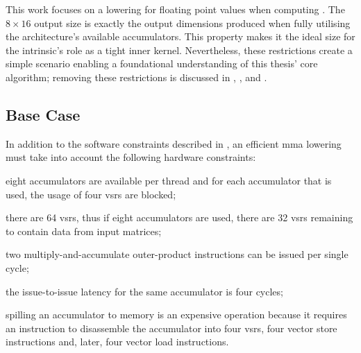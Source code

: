 \documentclass[\main/thesis.tex]{subfiles}
\begin{document}
This work focuses on a lowering for floating point values when computing .
The $8 \times 16$ output size is exactly the output dimensions produced when fully utilising the architecture's available accumulators.
This property makes it the ideal size for the intrinsic's role as a tight inner kernel.
Nevertheless, these restrictions create a simple scenario enabling a foundational understanding of this thesis' core algorithm; removing these restrictions is discussed in , , and .

\subsection{Base Case}
\label{sec:baseCase}
In addition to the software constraints described in , an efficient \gls{mma} lowering must take into account the following hardware constraints:
\begin{enumerate*}[itemjoin*={{ and }}, label=\fbox{\arabic*}]
  \item eight accumulators are available per thread and for each accumulator that is used, the usage of four \glspl{vsr} are blocked;
  \item there are 64 \glspl{vsr}, thus if eight accumulators are used, there are 32 \glspl{vsr} remaining to contain data from input matrices;
  \item two multiply-and-accumulate outer-product instructions can be issued per single cycle;
  \item the issue-to-issue latency for the same accumulator is four cycles;
  \item spilling an accumulator to memory is an expensive operation because it requires an instruction to disassemble the accumulator into four \glspl{vsr}, four vector store instructions and, later, four vector load instructions.
\end{enumerate*}
\end{document}
